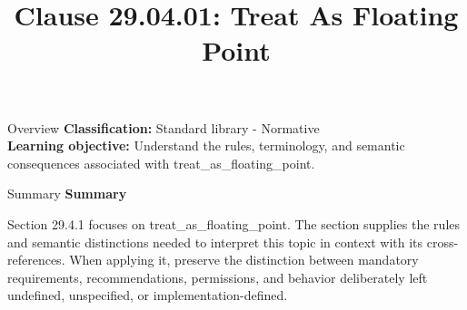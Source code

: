 \documentclass[10pt,letterpaper]{article}
\title{Clause 29.04.01: Treat As Floating Point}
\author{}
\date{}
\begin{document}
\maketitle
\begin{CornellOverviewBox}{Overview}
\textbf{Classification:} Standard library - Normative\\[2pt]
\textbf{Learning objective:} Understand the rules, terminology, and semantic consequences associated with treat\_as\_floating\_point.
\end{CornellOverviewBox}\begin{CornellSummaryBox}{Summary}
{\sffamily\bfseries\color{Accent} Summary}\par\vspace{3pt}Section 29.4.1 focuses on treat\_as\_floating\_point. The section supplies the rules and semantic distinctions needed to interpret this topic in context with its cross-references. When applying it, preserve the distinction between mandatory requirements, recommendations, permissions, and behavior deliberately left undefined, unspecified, or implementation-defined.
\end{CornellSummaryBox}
\end{document}
